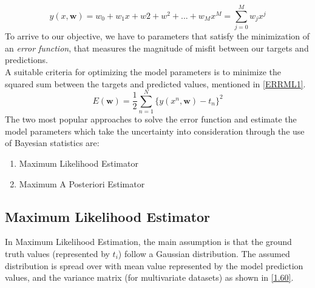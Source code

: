 \documentclass[12pt,twoside,a4paper]{article}
\begin{document}
\begin{equation}\label{POLY}
    y(x, \textbf{w}) = w_0 + w_1x + w2+w^2 + ... + w_Mx^M = \sum_{j=0}^{M}w_jx^j
\end{equation}
To arrive to our objective, we have to parameters that satisfy the minimization of an \textit{error function}, that measures the magnitude of misfit between our targets and predictions. \\ 
A suitable criteria for optimizing the model parameters is to minimize the squared sum between the targets and predicted values, mentioned in \ref{ERRML1}.
\begin{equation}\label{ERRML1}
    E(\textbf{w}) = \frac{1}{2}\sum_{n=1}^{N}\{y(x^n, \textbf{w})-t_n\}^2
\end{equation}
The two most popular approaches to solve the error function and estimate the model parameters which take the uncertainty into consideration through the use of Bayesian statistics \cite{statistical} are:
\begin{enumerate}
    \item Maximum Likelihood Estimator
    \item Maximum A Posteriori Estimator
\end{enumerate}
\subsection{Maximum Likelihood Estimator}
In Maximum Likelihood Estimation, the main assumption is that the ground truth values (represented by $t_i$) follow a Gaussian distribution. The assumed distribution is spread over with mean value represented by the model prediction values, and the variance matrix (for multivariate datasets) as shown in \eqref{1.60}.
\end{document}
